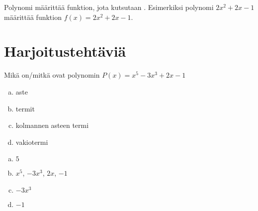 \begin{comment}
\laatikko{
Polynomi $P$, joka on astetta $n$, voidaan aina sieventää muotoon
\[P(x) = a_n x^n + a_{n-1} x^{n-1} + \ldots + a_1 x + a_0,\]
missä $a_0, a_1, \ldots, a_n$ ovat vakioita ja $a_n \neq 0$.
}
\end{comment}

Polynomi määrittää funktion, jota kutsutaan . Esimerkiksi polynomi $2x^2+2x-1$ määrittää funktion $f(x)=2x^2+2x-1$. 

\begin{comment}
\begin{esimerkki}
Jos polynomi $P$ on $P(x) = 5x^2-3x+2$,
\begin{align*}
&P(-3) = 5(-3)^2-3(-3)+2 = 45 + 9 + 2 = 56 \\
&P(-1) = 5(-1)^2-3(-1)+2 = 5 + 3 + 2 = 10 \\
&P(2) = 5\cdot 2^2-3\cdot 2+2 = 20 - 6 + 2 = 16.
\end{align*}
\end{esimerkki}

Samalla polynomifunktiolla voi olla useampia esityksiä polynomilausekkeena.
Esimerkiksi jos $P(x) = x^2-x^2+x+1$ ja $Q(x) = x+1$, $P$ ja $Q$ ovat samat
funktiot koska $x^2 - x^2 = 0$ kaikilla reaaliluvuilla x. Siis saman
polynomifunktion eri esityksissä lausekkeina suurimman termin aste voi olla
eri, esimerkiksi $P$:ssä se on 2 ja $Q$:ssa 1. Useimmiten kiinnostavin on
kuitenkin pienin mahdollinen aste, jolloin polynomifunktion $P$ aste olisi
myös 1.
\end{comment}

\section{Harjoitustehtäviä}

\begin{tehtava}
	Mikä on/mitkä ovat polynomin $P(x) = x^5-3x^3+2x-1$
	\begin{enumerate}[a)]
		\item aste
		\item termit
		\item kolmannen asteen termi
		\item vakiotermi
	\end{enumerate}

	\begin{vastaus}
		\begin{enumerate}[a)]
			\item $5$
			\item $x^5$, $-3x^3$, $2x$, $-1$
			\item $-3x^3$
			\item $-1$
		\end{enumerate}
	\end{vastaus}
\end{tehtava}

